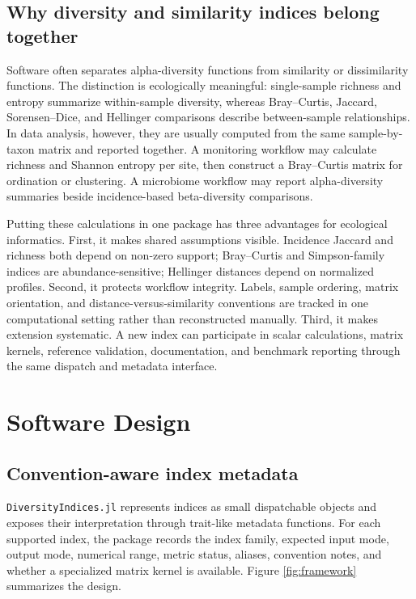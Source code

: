 \documentclass[preprint,12pt,authoryear]{elsarticle}
\begin{document}
\subsection{Why diversity and similarity indices belong together}

Software often separates alpha-diversity functions from similarity or
dissimilarity functions.  The distinction is ecologically meaningful:
single-sample richness and entropy summarize within-sample diversity, whereas
Bray--Curtis, Jaccard, Sorensen--Dice, and Hellinger comparisons describe
between-sample relationships.  In data analysis, however, they are usually
computed from the same sample-by-taxon matrix and reported together.  A
monitoring workflow may calculate richness and Shannon entropy per site, then
construct a Bray--Curtis matrix for ordination or clustering.  A microbiome
workflow may report alpha-diversity summaries beside incidence-based
beta-diversity comparisons.

Putting these calculations in one package has three advantages for ecological
informatics.  First, it makes shared assumptions visible.  Incidence Jaccard
and richness both depend on non-zero support; Bray--Curtis and Simpson-family
indices are abundance-sensitive; Hellinger distances depend on normalized
profiles.  Second, it protects workflow integrity.  Labels, sample ordering,
matrix orientation, and distance-versus-similarity conventions are tracked in
one computational setting rather than reconstructed manually.  Third, it makes
extension systematic.  A new index can participate in scalar calculations,
matrix kernels, reference validation, documentation, and benchmark reporting
through the same dispatch and metadata interface.

\section{Software Design}

\subsection{Convention-aware index metadata}

\texttt{DiversityIndices.jl} represents indices as small dispatchable objects
and exposes their interpretation through trait-like metadata functions.
For each supported index, the package records the index family, expected input
mode, output mode, numerical range, metric status, aliases, convention notes,
and whether a specialized matrix kernel is available.  Figure
\ref{fig:framework} summarizes the design.
\end{document}
